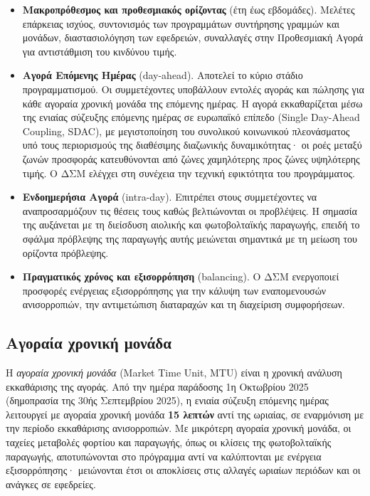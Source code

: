 \begin{itemize}
\item \textbf{Μακροπρόθεσμος και προθεσμιακός ορίζοντας} (έτη έως εβδομάδες). Μελέτες
      επάρκειας ισχύος, συντονισμός των προγραμμάτων συντήρησης γραμμών και μονάδων,
      διαστασιολόγηση των εφεδρειών, συναλλαγές στην Προθεσμιακή Αγορά για αντιστάθμιση
      του κινδύνου τιμής.
\item \textbf{Αγορά Επόμενης Ημέρας} (day-ahead). Αποτελεί το κύριο στάδιο
      προγραμματισμού. Οι συμμετέχοντες υποβάλλουν εντολές αγοράς και πώλησης για κάθε
      αγοραία χρονική μονάδα της επόμενης ημέρας. Η αγορά εκκαθαρίζεται μέσω της ενιαίας
      σύζευξης επόμενης ημέρας σε ευρωπαϊκό επίπεδο (Single Day-Ahead Coupling, SDAC), με
      μεγιστοποίηση του συνολικού κοινωνικού πλεονάσματος υπό τους περιορισμούς της
      διαθέσιμης διαζωνικής δυναμικότητας· οι ροές μεταξύ ζωνών προσφοράς κατευθύνονται
      από ζώνες χαμηλότερης προς ζώνες υψηλότερης τιμής. Ο ΔΣΜ ελέγχει στη συνέχεια την
      τεχνική εφικτότητα του προγράμματος.
\item \textbf{Ενδοημερήσια Αγορά} (intra-day). Επιτρέπει στους συμμετέχοντες να
      αναπροσαρμόζουν τις θέσεις τους καθώς βελτιώνονται οι προβλέψεις. Η σημασία της
      αυξάνεται με τη διείσδυση αιολικής και φωτοβολταϊκής παραγωγής, επειδή το σφάλμα
      πρόβλεψης της παραγωγής αυτής μειώνεται σημαντικά με τη μείωση του ορίζοντα
      πρόβλεψης.
\item \textbf{Πραγματικός χρόνος και εξισορρόπηση} (balancing). Ο ΔΣΜ ενεργοποιεί προσφορές
      ενέργειας εξισορρόπησης για την κάλυψη των εναπομενουσών ανισορροπιών, την
      αντιμετώπιση διαταραχών και τη διαχείριση συμφορήσεων.
\end{itemize}

\subsection{Αγοραία χρονική μονάδα}
\label{sec:mtu}

Η \emph{αγοραία χρονική μονάδα} (Market Time Unit, MTU) είναι η χρονική ανάλυση εκκαθάρισης
της αγοράς. Από την ημέρα παράδοσης 1η Οκτωβρίου 2025 (δημοπρασία της 30ής Σεπτεμβρίου
2025), η ενιαία σύζευξη επόμενης ημέρας λειτουργεί με αγοραία χρονική μονάδα \textbf{15
λεπτών} αντί της ωριαίας, σε εναρμόνιση με την περίοδο εκκαθάρισης ανισορροπιών. Με
μικρότερη αγοραία χρονική μονάδα, οι ταχείες μεταβολές φορτίου και παραγωγής, όπως οι
κλίσεις της φωτοβολταϊκής παραγωγής, αποτυπώνονται στο πρόγραμμα αντί να καλύπτονται με
ενέργεια εξισορρόπησης· μειώνονται έτσι οι αποκλίσεις στις αλλαγές ωριαίων περιόδων και οι
ανάγκες σε εφεδρείες.

